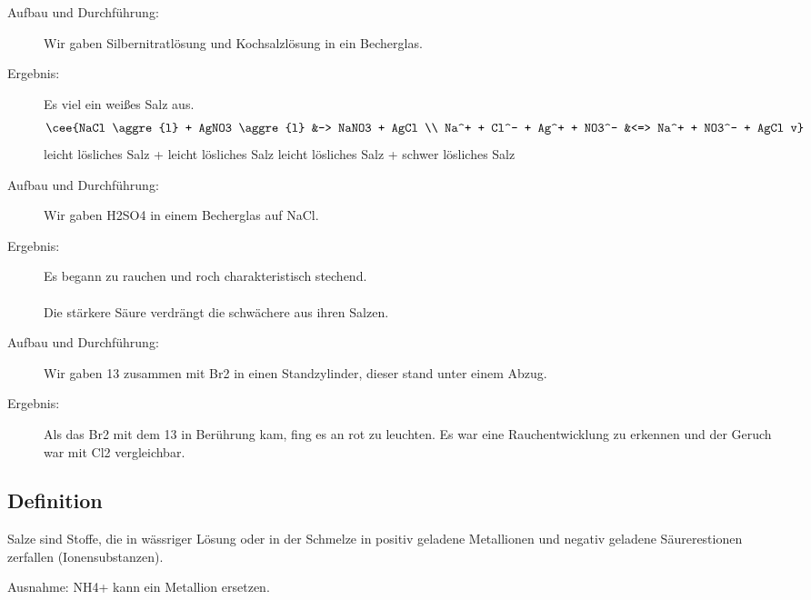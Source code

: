 \begin{description}
   \item[Aufbau und Durchführung:] Wir gaben Silbernitratlösung und Kochsalzlösung in ein Becherglas.
   \item[Ergebnis:] Es viel ein weißes Salz aus.
   \begin{align*}
      \cee{NaCl \aggre{l} + AgNO3 \aggre{l} &-> NaNO3 + AgCl \\
      Na^+ + Cl^- + Ag^+ + NO3^- &<=> Na^+ + NO3^- + AgCl v}
   \end{align*}
   leicht lösliches Salz + leicht lösliches Salz \ce{->} leicht lösliches Salz + schwer lösliches Salz
\end{description}

\begin{description}
   \item[Aufbau und Durchführung:] Wir gaben \ac{H2SO4} in einem Becherglas auf \ac{NaCl}.
   \item[Ergebnis:] Es begann zu rauchen und roch charakteristisch stechend. \\
    \\
   Die stärkere Säure verdrängt die schwächere aus ihren Salzen. \\
\end{description}

\begin{description}
   \item[Aufbau und Durchführung:] Wir gaben \ac{13} zusammen mit \ac{Br2} in einen Standzylinder, dieser stand unter einem Abzug.
   \item[Ergebnis:] Als das \ac{Br2} mit dem \ac{13} in Berührung kam, fing es an rot zu leuchten. Es war eine Rauchentwicklung zu erkennen und der Geruch war mit \ac{Cl2} vergleichbar.
\end{description}

\subsection{Definition}
Salze sind Stoffe, die in wässriger Lösung oder in der Schmelze in positiv geladene Metallionen und negativ geladene Säurerestionen zerfallen (Ionensubstanzen).

\begin{list}{}{}
   \item[Ausnahme:] \ac{NH4+} kann ein Metallion ersetzen.
\end{list}
